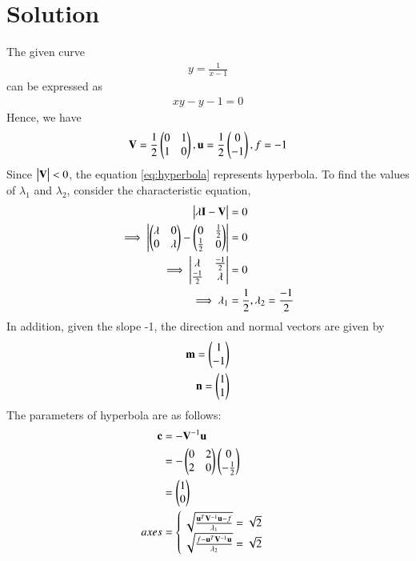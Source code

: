 \documentclass[journal,12pt,twocolumn]{IEEEtran}
\begin{document}
\section{Solution}
The given curve 
\begin{align}
	y =\frac{1}{x-1}
\end{align}
can be expressed as 
\begin{align}
	xy - y - 1 = 0 \label{eq:hyperbola}
\end{align}
Hence, we have
\begin{align}
	\mathbf{V} = \frac{1}{2}\begin{pmatrix}0 & 1 \\ 1 & 0\end{pmatrix}, 
	\mathbf{u} = \frac{1}{2}\begin{pmatrix}0 \\-1\end{pmatrix},
	f = -1
\end{align}
Since $\begin{vmatrix}\mathbf{V}\end{vmatrix} < 0$, the equation \eqref{eq:hyperbola} represents hyperbola.
To find the values of $\lambda_1$ and $\lambda_2$, consider the characteristic equation,
\begin{align}
	\begin{vmatrix}\lambda\mathbf{I} - \mathbf{V}\end{vmatrix} &= 0\\
	\implies \begin{vmatrix}\begin{pmatrix}\lambda & 0\\0 & \lambda\end{pmatrix} - \begin{pmatrix}0 & \frac{1}{2} \\ \frac{1}{2} & 0\end{pmatrix}\end{vmatrix} &= 0\\
	\implies \begin{vmatrix} \lambda & \frac{-1}{2} \\ \frac{-1}{2} & \lambda\end{vmatrix} &= 0\\
	\implies \lambda_1 &= \frac{1}{2} , \lambda_2 = \frac{-1}{2}
\end{align}
In addition, given the slope -1, the direction and normal vectors are given by 
\begin{align}
	\mathbf{m} = \begin{pmatrix}1 \\ -1\end{pmatrix} \\
	\mathbf{n} = \begin{pmatrix} 1 \\ 1\end{pmatrix}
\end{align}
The parameters of hyperbola are as follows:
\begin{align}
	\mathbf{c} &= -\mathbf{V}^{-1}\mathbf{u} \\
	&= -\begin{pmatrix}0 & 2\\ 2 & 0\end{pmatrix}\begin{pmatrix}0 \\ -\frac{1}{2}\end{pmatrix} \\
	&= \begin{pmatrix}1 \\ 0\end{pmatrix}\\
	axes &= \begin{cases}
	\sqrt{\frac{\mathbf{u}^T\mathbf{V}^{-1}\mathbf{u} - f}{\lambda_1}} = \sqrt{2}\\
 \sqrt{\frac{f-\mathbf{u}^T\mathbf{V}^{-1}\mathbf{u}}{\lambda_2}} = \sqrt{2}
\end{cases}
\end{align}
\end{document}
